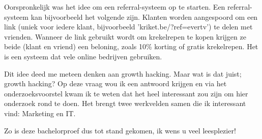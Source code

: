 Oorspronkelijk was het idee om een referral-systeem op te starten. Een referral-systeem kan bijvoorbeeld het volgende zijn. Klanten worden aangespoord om een link (uniek voor iedere klant, bijvoorbeeld 'kriket.be/?ref=evertv') te delen met vrienden. Wanneer de link gebruikt wordt om krekelrepen te kopen krijgen ze beide (klant en vriend) een beloning, zoals 10\% korting of gratis krekelrepen. Het is een systeem dat vele online bedrijven gebruiken. 

Dit idee deed me meteen denken aan growth hacking. Maar wat is dat juist; growth hacking? Op deze vraag wou ik een antwoord krijgen en via het onderzoeksvoorstel kwam ik te weten dat het heel interessant zou zijn om hier onderzoek rond te doen. Het brengt twee werkvelden samen die ik interessant vind: Marketing en IT.

Zo is deze bachelorproef dus tot stand gekomen, ik wens u veel leesplezier!
